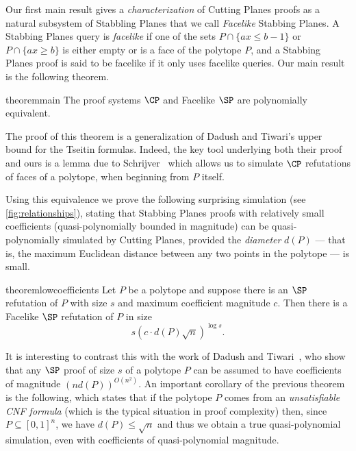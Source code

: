 Our first main result gives a \emph{characterization} of Cutting Planes proofs as a natural subsystem of Stabbling Planes that we call \emph{Facelike} Stabbing Planes.
%
A Stabbing Planes query is \emph{facelike} if one of the sets $P \cap \{ax \leq b-1\}$ or $P \cap \{ax \geq b\}$ is either empty or is a face of the polytope $P$, and a Stabbing Planes proof is said to be facelike if it only uses facelike queries. 
Our main result is the following theorem. 

\begin{restatable}{theorem}{main}
	\label{thm:main}
	The proof systems $\CP$ and Facelike $\SP$ are polynomially equivalent.
\end{restatable}

The proof of this theorem is a generalization of Dadush and Tiwari's upper bound for the Tseitin formulas. Indeed, the key tool underlying both their proof and ours is a lemma due to Schrijver~\cite{SCHRIJVER1980291} which allows us to simulate $\CP$ refutations of faces of a polytope, when beginning from $P$ itself.

Using this equivalence we prove the following surprising simulation (see \autoref{fig:relationships}), stating that Stabbing Planes proofs with relatively small coefficients (quasi-polynomially bounded in magnitude) can be quasi-polynomially simulated by Cutting Planes, provided the \emph{diameter} $d(P)$ --- that is, the maximum Euclidean distance between any two points in the polytope --- is small.

\begin{restatable}{theorem}{lowcoefficients}
	\label{thm:low-coefficients}
	Let $P$ be a polytope and suppose there is an $\SP$ refutation of $P$ with size $s$ and maximum coefficient magnitude $c$. 
	Then there is a Facelike $\SP$ refutation of $P$ in size 
	\[ s (c \cdot d(P) \sqrt{n})^{\log s}. \]	
\end{restatable}

It is interesting to contrast this with the work of Dadush and Tiwari~\cite{TseitinUpperBound}, who show that any $\SP$ proof of size $s$ of a polytope $P$ can be assumed to have coefficients of magnitude $(nd(P))^{O(n^2)}$.
An important corollary of the previous theorem is the following, which states that if the polytope $P$ comes from an \emph{unsatisfiable CNF formula} (which is the typical situation in proof complexity) then, since $P \subseteq [0,1]^n$, we have $d(P) \leq \sqrt{n}$ and thus we obtain a true quasi-polynomial simulation, even with coefficients of quasi-polynomial magnitude.

